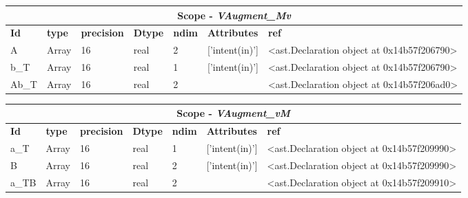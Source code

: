 \documentclass{report}
\begin{document}
\begin{center}
\begin{longtable}{|p{3.5cm}|p{1.5cm}|p{1.5cm}|p{1.5cm}|p{1cm}|p{2cm}|p{4cm}| }
\hline
\multicolumn{7}{|c|}{\textbf{Scope} -  \textbf{\textit{VAugment\_Mv}}} \\ 
\hline
\textbf{Id} & \textbf{type} & \textbf{precision} & \textbf{Dtype} & \textbf{ndim} & \textbf{Attributes} & \textbf{ref} \\\hline

A & Array & 16 & real & 2 & ['intent(in)'] & <ast.Declaration object at 0x14b57f206790> \\\hline

b\_T & Array & 16 & real & 1 & ['intent(in)'] & <ast.Declaration object at 0x14b57f206790> \\\hline

Ab\_T & Array & 16 & real & 2 &  & <ast.Declaration object at 0x14b57f206ad0> \\\hline

\end{longtable}
\end{center}

 \vspace{1cm}

\begin{center}
\begin{longtable}{|p{3.5cm}|p{1.5cm}|p{1.5cm}|p{1.5cm}|p{1cm}|p{2cm}|p{4cm}| }
\hline
\multicolumn{7}{|c|}{\textbf{Scope} -  \textbf{\textit{VAugment\_vM}}} \\ 
\hline
\textbf{Id} & \textbf{type} & \textbf{precision} & \textbf{Dtype} & \textbf{ndim} & \textbf{Attributes} & \textbf{ref} \\\hline

a\_T & Array & 16 & real & 1 & ['intent(in)'] & <ast.Declaration object at 0x14b57f209990> \\\hline

B & Array & 16 & real & 2 & ['intent(in)'] & <ast.Declaration object at 0x14b57f209990> \\\hline

a\_TB & Array & 16 & real & 2 &  & <ast.Declaration object at 0x14b57f209910> \\\hline

\end{longtable}
\end{center}

 \vspace{1cm}
\end{document}
